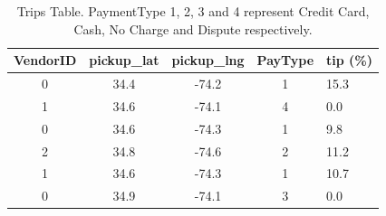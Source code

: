 

\begin{table}
	\small
	\centering
	\caption{\small Trips Table. PaymentType 1, 2, 3 and 4 represent Credit Card, Cash, No Charge and Dispute respectively.}
	\begin{tabular}{| c | c | c | c | l |}
		\hline
		{\bf VendorID} & \textbf{pickup\_lat} & \textbf{pickup\_lng} & \textbf{PayType} & \textbf{tip (\%)} \\ \hline
		0 & 34.4 & -74.2 & 1 & 15.3 \\ \hline
		1 & 34.6 & -74.1 & 4 & 0.0 \\ \hline
		0 & 34.6 & -74.3 & 1 & 9.8 \\ \hline
		2 & 34.8 & -74.6 & 2 & 11.2 \\ \hline
		1 & 34.6 & -74.3 & 1 & 10.7 \\ \hline
		0 & 34.9 & -74.1 & 3 & 0.0 \\
		\hline
	\end{tabular}
	\label{tbl:fact}
\end{table}


